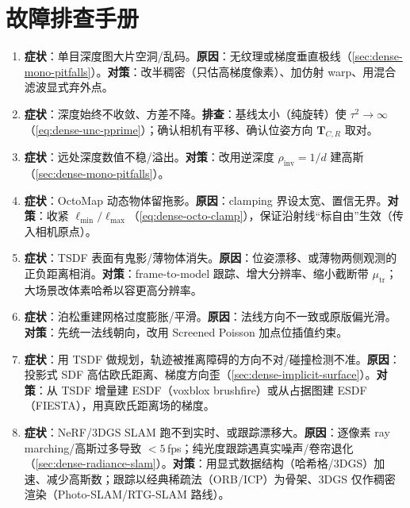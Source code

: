 \section*{故障排查手册}
\begin{enumerate}
  \item \textbf{症状}：单目深度图大片空洞/乱码。\textbf{原因}：无纹理或梯度垂直极线（\cref{sec:dense-mono-pitfalls}）。\textbf{对策}：改半稠密（只估高梯度像素）、加仿射 warp、用混合滤波显式弃外点。
  \item \textbf{症状}：深度始终不收敛、方差不降。\textbf{排查}：基线太小（纯旋转）使 $\tau^2\to\infty$（\cref{eq:dense-unc-pprime}）；确认相机有平移、确认位姿方向 $\mathbf{T}_{C,R}$ 取对。
  \item \textbf{症状}：远处深度数值不稳/溢出。\textbf{对策}：改用逆深度 $\rho_{\mathrm{inv}}=1/d$ 建高斯（\cref{sec:dense-mono-pitfalls}）。
  \item \textbf{症状}：OctoMap 动态物体留拖影。\textbf{原因}：clamping 界设太宽、置信无界。\textbf{对策}：收紧 $\ell_{\min}/\ell_{\max}$（\cref{eq:dense-octo-clamp}），保证沿射线“标自由”生效（传入相机原点）。
  \item \textbf{症状}：TSDF 表面有鬼影/薄物体消失。\textbf{原因}：位姿漂移、或薄物两侧观测的正负距离相消。\textbf{对策}：frame-to-model 跟踪、增大分辨率、缩小截断带 $\mu_{\mathrm{tr}}$；大场景改体素哈希以容更高分辨率。
  \item \textbf{症状}：泊松重建网格过度膨胀/平滑。\textbf{原因}：法线方向不一致或原版偏光滑。\textbf{对策}：先统一法线朝向，改用 Screened Poisson 加点位插值约束。
  \item \textbf{症状}：用 TSDF 做规划，轨迹被推离障碍的方向不对/碰撞检测不准。\textbf{原因}：投影式 SDF 高估欧氏距离、梯度方向歪（\cref{sec:dense-implicit-surface}）。\textbf{对策}：从 TSDF 增量建 ESDF（voxblox brushfire）或从占据图建 ESDF（FIESTA），用真欧氏距离场的梯度。
  \item \textbf{症状}：NeRF/3DGS SLAM 跑不到实时、或跟踪漂移大。\textbf{原因}：逐像素 ray marching/高斯过多导致 $<5$\,fps；纯光度跟踪遇真实噪声/卷帘退化（\cref{sec:dense-radiance-slam}）。\textbf{对策}：用显式数据结构（哈希格/3DGS）加速、减少高斯数；跟踪以经典稀疏法（ORB/ICP）为骨架、3DGS 仅作稠密渲染（Photo-SLAM/RTG-SLAM 路线）。
\end{enumerate}
